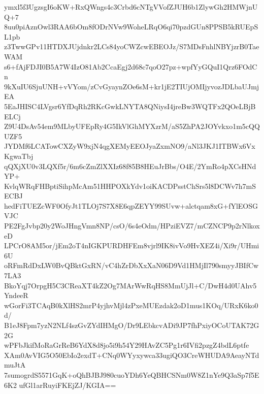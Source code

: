 ymxl5f3UgzsgI6oKW+RxQWngs4c3Crbd6cNTgVVofZJUH6b1ZlywGh2HMWjnUQ+7
8uu0piAznOwl3RAA6bOm8fODrNVw9WoheLRqO6qi70pzdGUn8PPSB5kRUEpSL1pb
z3TwwGPv11HTDXJUjdnkr2LCs84yoCWZcwEBEOJz/S7MDsFnhlNBYjzrB0TaeWAM
s6+fAjFDJI0B5A7W4IzO81Ab2CcaEgj2d68c7qoO27pz+wpfYyGQuI1Qrz6FOdCn
9kXuIU6SjuUNH+vVYom/zCvGyaynZOe6sM+kr1jE2TIUjOMIjyvozJDLbaUJmjEA
5EaJHISC4LVgsr6YfDqRh2RKcGwkLNYTA8QNiysI4jreBw3WQTFx2QOeLBjBELCj
Z9U4DsAv54em9MLbyUFEpRy4G5IkVlGhMYXzrM/aS5ZhPA2JOYvkxo1m5cQQUZF5
JYDMf6LCATowCXZyW9xjN4qgXEMyEEOJyaZxmNO9/aNl3JKJ1ITBWx6VxKgwaTbj
qQXjXU0v3LQXf5r/6m6cZmZlXXIz68f85B8HEuJrBbs/O4E/2YmRo4pXCsHNdYP+
KvlqWRqFHBptiSihpMcAm51HHPOXkYdv1oiKACDPsstChSrs5l8DCWv7h7mSECBJ
hedFiTUEZcWF0OfyJt1TLOj7S7X8E6qpZEYY99SUvw+alctqam8xG+fYlEOSGVJC
PE2FgJvbp20y2WoJHngVmn8NP/csO/6s4eOdm/HPziEVZ7/mCZNCP9p2rNlkoxeD
LPCrO8AM5or/jEm2oT4nIGKPURDHFEm8vjrl9IK8ivVo9HvXEZ4i/Xi9r/UHmi6U
oRFmRdDxLW0BvQBktGxRN/vC4hZrDbXxXaN06D9Vd1HMjIl790smyyJBIfCw7LA3
BkoYqj7OrpgH5C3CReaXT4kZ2Og7MArWwRqHS8MmUjJl+C/DwH4d0UAhv5YndeeR
wGorFi3TCAqB0kXlHS2mrP4yjhvMjl4zPxeMUEzdak2oD1mus1KOq/URxK6ko0d/
B1eJ8Fpm7yzN2NLf4szGvZYdIHMgO/Dr9LEbkcvADi9JP7fhPxiyOCoUTAK72G2G
wPFbJkifMoRaGrReB6YdX8d8jo5i9h54Y29HAvZC5Pg1r6IVfi2pzgZ4bdL6ptfe
XAm0AvVIG5O50EbIo2exdT+CNq0WYyxywca33ugiQO3CreWHUDA9AeayNTdmuJtA
7sumogrdS5571GqK+oQhBJBJ980cuoYDh6YeQBHCSNm0W8Z1nYe9Q3aSp7f5E6K2
ufGl1arRuyiFKEjZJ/KGIA==
